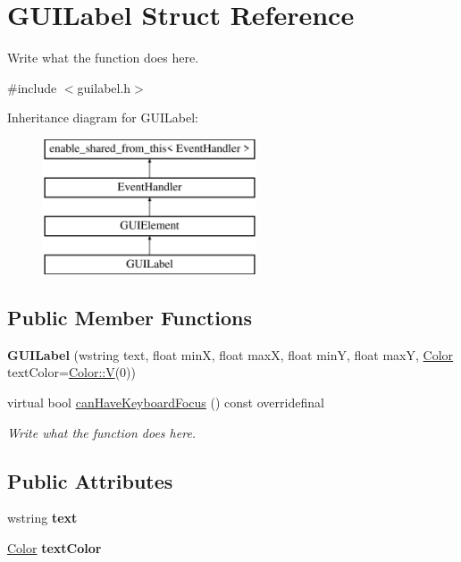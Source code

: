 \hypertarget{structGUILabel}{\section{G\+U\+I\+Label Struct Reference}
\label{structGUILabel}
}


Write what the function does here.  




{\ttfamily \#include $<$guilabel.\+h$>$}

Inheritance diagram for G\+U\+I\+Label\+:\begin{figure}[H]
\begin{center}
\leavevmode
\includegraphics[height=4.000000cm]{structGUILabel}
\end{center}
\end{figure}
\subsection*{Public Member Functions}
\begin{DoxyCompactItemize}
\item 
\hypertarget{structGUILabel_ac4d7442b38260774b14536b343f4ff51}{{\bfseries G\+U\+I\+Label} (wstring text, float min\+X, float max\+X, float min\+Y, float max\+Y, \hyperlink{structColor}{Color} text\+Color=\hyperlink{structColor_a723061c1cca0072a8ecb591c4c3b4479}{Color\+::\+V}(0))}\label{structGUILabel_ac4d7442b38260774b14536b343f4ff51}

\item 
virtual bool \hyperlink{structGUILabel_aa0127a15c722bc35de3441e8d2952a28}{can\+Have\+Keyboard\+Focus} () const overridefinal
\begin{DoxyCompactList}\small\item\em Write what the function does here. \end{DoxyCompactList}\end{DoxyCompactItemize}
\subsection*{Public Attributes}
\begin{DoxyCompactItemize}
\item 
\hypertarget{structGUILabel_a455ecc85732712f002fce8dcb4f8b0db}{wstring {\bfseries text}}\label{structGUILabel_a455ecc85732712f002fce8dcb4f8b0db}

\item 
\hypertarget{structGUILabel_a6ecebb11c95e284a76e706d774966067}{\hyperlink{structColor}{Color} {\bfseries text\+Color}}\label{structGUILabel_a6ecebb11c95e284a76e706d774966067}

\end{DoxyCompactItemize}
